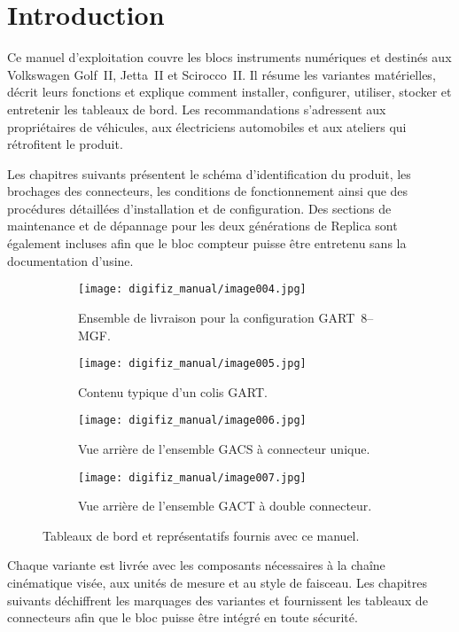 \chapter{Introduction}\label{ch:introduction}

Ce manuel d'exploitation couvre les blocs instruments numériques \ReplicaGenOne{} et \ReplicaNextLong{} destinés aux Volkswagen Golf~II, Jetta~II et Scirocco~II.
Il résume les variantes matérielles, décrit leurs fonctions et explique comment installer, configurer, utiliser, stocker et entretenir les tableaux de bord.
Les recommandations s'adressent aux propriétaires de véhicules, aux électriciens automobiles et aux ateliers qui rétrofitent le produit.

Les chapitres suivants présentent le schéma d'identification du produit, les brochages des connecteurs, les conditions de fonctionnement ainsi que des procédures détaillées d'installation et de configuration.
Des sections de maintenance et de dépannage pour les deux générations de Replica sont également incluses afin que le bloc compteur puisse être entretenu sans la documentation d'usine.

\begin{figure}[htbp]
    \centering
    \begin{subfigure}{0.48\textwidth}
        \texttt{[image: digifiz\_manual/image004.jpg]}
        \caption{Ensemble de livraison pour la configuration GART~8--MGF.}
    \end{subfigure}\hfill
    \begin{subfigure}{0.48\textwidth}
        \texttt{[image: digifiz\_manual/image005.jpg]}
        \caption{Contenu typique d'un colis GART.}
    \end{subfigure}
    \begin{subfigure}{0.48\textwidth}
        \texttt{[image: digifiz\_manual/image006.jpg]}
        \caption{Vue arrière de l'ensemble GACS à connecteur unique.}
    \end{subfigure}\hfill
    \begin{subfigure}{0.48\textwidth}
        \texttt{[image: digifiz\_manual/image007.jpg]}
        \caption{Vue arrière de l'ensemble GACT à double connecteur.}
    \end{subfigure}
    \caption{Tableaux de bord \ReplicaGenOne{} et \ReplicaNextLong{} représentatifs fournis avec ce manuel.}
\end{figure}

Chaque variante est livrée avec les composants nécessaires à la chaîne cinématique visée, aux unités de mesure et au style de faisceau.
Les chapitres suivants déchiffrent les marquages des variantes et fournissent les tableaux de connecteurs afin que le bloc puisse être intégré en toute sécurité.
